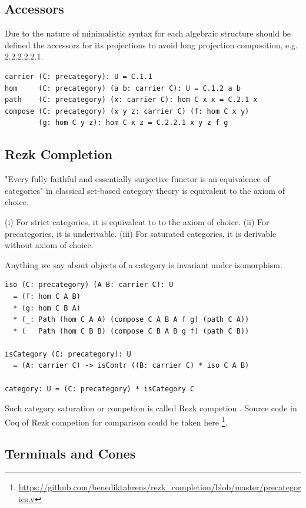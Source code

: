 \documentclass{article}
\begin{document}
\subsection{Accessors}

Due to the nature of minimalistic syntax for each algebraic structure
should be defined the accessors for its projections to avoid long projection
composition, e.g. 2.2.2.2.2.1.

\begin{lstlisting}[mathescape=true]
carrier (C: precategory): U = C.1.1
hom     (C: precategory) (a b: carrier C): U = C.1.2 a b
path    (C: precategory) (x: carrier C): hom C x x = C.2.1 x
compose (C: precategory) (x y z: carrier C) (f: hom C x y)
        (g: hom C y z): hom C x z = C.2.2.1 x y z f g
\end{lstlisting}

\subsection{Rezk Completion}

"Every fully faithful and essentially surjective functor
is an equivalence of categories" in classical set-based category
theory is equivalent to the axiom of choice.

(i) For strict categories, it is equivalent to to the axiom of choice.
(ii) For precategories, it is underivable.
(iii) For saturated categories, it is derivable without axiom of choice.

Anything we say about objects of a category is invariant under isomorphism.

\begin{lstlisting}
iso (C: precategory) (A B: carrier C): U
  = (f: hom C A B)
  * (g: hom C B A)
  * (_: Path (hom C A A) (compose C A B A f g) (path C A))
  * (   Path (hom C B B) (compose C B A B g f) (path C B))

isCategory (C: precategory): U
  = (A: carrier C) -> isContr ((B: carrier C) * iso C A B)

category: U = (C: precategory) * isCategory C
\end{lstlisting}

Such category saturation or competion is called Rezk competion \cite{Shulman15}.
Source code in Coq of Rezk competion for comparison could be taken here \footnote{\url{https://github.com/benediktahrens/rezk_completion/blob/master/precategories.v}}.

\subsection{Terminals and Cones}
\end{document}

